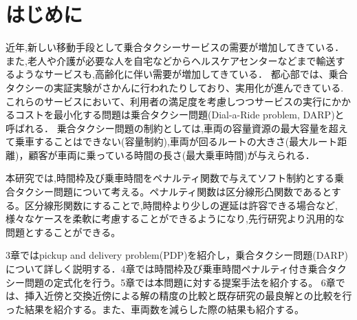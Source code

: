 \chapter{はじめに}
近年,新しい移動手段として乗合タクシーサービスの需要が増加してきている．また,老人や介護が必要な人を自宅などからヘルスケアセンターなどまで輸送するようなサービスも,高齢化に伴い需要が増加してきている．
都心部では、乗合タクシーの実証実験がさかんに行われたりしており、実用化が進んできている.
これらのサービスにおいて、利用者の満足度を考慮しつつサービスの実行にかかるコストを最小化する問題は乗合タクシー問題(Dial-a-Ride problem, DARP)と呼ばれる．
乗合タクシー問題の制約としては,車両の容量資源の最大容量を超えて乗車することはできない(容量制約),車両が回るルートの大きさ(最大ルート距離)，顧客が車両に乗っている時間の長さ(最大乗車時間)が与えられる．

本研究では,時間枠及び乗車時間をペナルティ関数で与えてソフト制約とする乗合タクシー問題について考える。ペナルティ関数は区分線形凸関数であるとする。区分線形関数にすることで,時間枠より少しの遅延は許容できる場合など,様々なケースを柔軟に考慮することができるようになり,先行研究より汎用的な問題とすることができる。

3章ではpickup and delivery problem(PDP)を紹介し，乗合タクシー問題(DARP)について詳しく説明する．4章では時間枠及び乗車時間ペナルティ付き乗合タクシー問題の定式化を行う。5章では本問題に対する提案手法を紹介する。
6章では、挿入近傍と交換近傍による解の精度の比較と既存研究の最良解との比較を行った結果を紹介する。また、車両数を減らした際の結果も紹介する。
